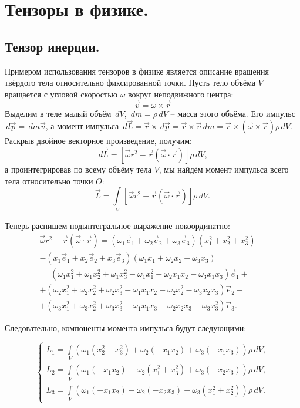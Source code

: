 \section{Тензоры в физике.}
\subsection{Тензор инерции.}
	Примером использования тензоров в физике является описание вращения твёрдого тела относительно фиксированной точки. Пусть тело объёма \( V \) вращается с угловой скоростью \( \omega \) вокруг неподвижного центра: \[ \vec{v} = \omega\times\vec{r} \]
	Выделим в теле малый объём \( \,d V \), \( \,d m = \rho \,d V \) -- масса этого объёма. Его импульс \( \,d \vec{p} = \,d m \vec{v} \), а момент импульса \( \,d \vec{L} = \vec{r}\times\,d\vec{p} = \vec{r}\times\vec{v}\,d m = \vec{r}\times(\vec{\omega}\times\vec{r})\rho\,d V \). Раскрыв двойное векторное произведение, получим:
	\[ \,d \vec{L} = [\vec{\omega} r^2 - \vec{r}(\vec{\omega}\cdot\vec{r})]\rho\,d V, \]
	а проинтегрировав по всему объёму тела \( V \), мы найдём момент импульса всего тела относительно точки \( O \):
	\[ \vec{L} = \int\limits_V [\vec{\omega} r^2 - \vec{r}(\vec{\omega}\cdot\vec{r})]\rho\,d V. \]

	Теперь распишем подынтегральное выражение покоординатно: %
	\[
	\begin{array}{c}
		\vec{\omega} r^2 - \vec{r}(\vec{\omega}\cdot\vec{r}) =
		(\omega_1 \vec{e}_1 + \omega_2 \vec{e}_2 + \omega_3 \vec{e}_3)(x_1^2+x_2^2+x_3^2) - \\
		- (x_1 \vec{e}_1 + x_2 \vec{e}_2 + x_3 \vec{e}_3)(\omega_1 x_1 + \omega_2 x_2 + \omega_3 x_3) = \\
		= (\omega_1 x_1^2 + \omega_1 x_2^2 + \omega_1 x_3^2 - \omega_1 x_1^2 - \omega_2 x_1 x_2 - \omega_3 x_1 x_3 ) \vec{e}_1 + \\
		+ (\omega_2 x_1^2 + \omega_2 x_2^2 + \omega_2 x_3^2 - \omega_1 x_1 x_2 - \omega_2 x_2^2 - \omega_3 x_2 x_3 ) \vec{e}_2 + \\
		+ (\omega_3 x_1^2 + \omega_3 x_2^2 + \omega_3 x_3^2 - \omega_1 x_1 x_3 - \omega_2 x_2 x_3 - \omega_3 x_3^2 ) \vec{e}_3.
	\end{array}
	\]

	Следовательно, компоненты момента импульса будут следующими:

	\[
	\left\{
	\begin{array}{l}
		L_1 = \int\limits_V(\omega_1(x_2^2+x_3^2)+\omega_2(-x_1x_2)+\omega_3(-x_1x_3))\rho\,d V, \\
		L_2 = \int\limits_V(\omega_1(-x_1x_2)+\omega_2(x_1^2+x_3^2)+\omega_3(-x_2x_3))\rho\,d V, \\
		L_3 = \int\limits_V(\omega_1(-x_1x_2)+\omega_2(-x_2x_3)+\omega_3(x_1^2+x_2^2))\rho\,d V.
	\end{array} \right.
	\]

